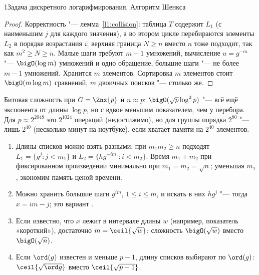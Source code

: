 \begin{lecture}{1}{Задача дискретного логарифмирования. Алгоритм Шенкса}
\begin{proof}
Корректность "--- лемма~\ref{l1:collision}: таблица $T$ содержит $L_1$ (с наименьшим $j$ для
каждого значения), а во втором цикле перебираются элементы $L_2$ в порядке возрастания $i$;
верхняя граница $N \ge n$ вместо $n$ тоже подходит, так как $m^2 \ge N \ge n$. Малые шаги
требуют $m - 1$ умножений, вычисление $u = g^{-m}$ "--- $\bigO(\log m)$ умножений и одно обращение,
большие шаги "--- не более $m - 1$ умножений. Хранится $m$ элементов. Сортировка $m$ элементов
стоит $\bigO(m \log m)$ сравнений, $m$ двоичных поисков "--- столько же.
\end{proof}

Битовая сложность при $G = \Znx{p}$ и $n \approx p$: $\bigO(\sqrt p \log^2 p)$ "--- всё ещё
экспонента от длины $\log p$, но с вдвое меньшим показателем, чем у перебора. Для $p \approx 2^{2048}$
это $2^{1024}$ операций (недостижимо), но для группы порядка $2^{80}$ "--- лишь $2^{40}$
(несколько минут на ноутбуке), если хватает памяти на $2^{40}$ элементов.

\begin{remark}[варианты]
\begin{enumerate}
  \item Длины списков можно взять разными: при $m_1 m_2 \ge n$ подходят $L_1 = \{g^j : j < m_1\}$
    и $L_2 = \{h g^{-i m_1} : i < m_2\}$. Время $m_1 + m_2$ при фиксированном произведении
    минимально при $m_1 = m_2 = \sqrt n$; уменьшая $m_1$, экономим память ценой времени.
  \item Можно хранить большие шаги $g^{im}$, $1 \le i \le m$, и искать в них $h g^{j}$ "---
    тогда $x = im - j$; это вариант \cite[разд.~2.7]{hps}.
  \item Если известно, что $x$ лежит в интервале длины $w$ (например, показатель «короткий»),
    достаточно $m = \ceil{\sqrt w}$: сложность $\bigO(\sqrt w)$ вместо $\bigO(\sqrt n)$.
  \item Если $\ord(g)$ известен и меньше $p - 1$, длину списков выбирают по $\ord(g)$:
    $\ceil{\sqrt{\ord g}}$ вместо $\ceil{\sqrt{p - 1}}$.
\end{enumerate}
\end{remark}


\end{lecture}
